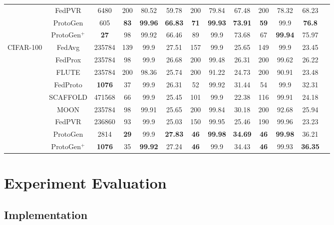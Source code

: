 \documentclass[lettersize,journal]{IEEEtran}
\begin{document}
\begin{table}[t]
{\begin{tabular}{ccccccccccccc}
& FedPVR   & 6480 & 200 & 80.52 & 59.78 & 200 & 79.84 & 67.48 & 200 & 78.32 & 68.23 \\
& \textsf{ProtoGen}   & 605 & \textbf{83} & \textbf{99.96} & \textbf{66.83} & \textbf{71} & \textbf{99.93} & \textbf{73.91} & \textbf{59} & 99.9 & \textbf{76.8} \\
& \textsf{ProtoGen}$^+$   & \textbf{27} & 98 & 99.92 & 66.46 & 89 & 99.9 & 73.68 & 67 & \textbf{99.94} & 75.97 \\
\midrule
\multirow{9}{2cm}{\centering CIFAR-100} 
& FedAvg   & 235784 & 139 & 99.9 & 27.51 & 157 & 99.9 & 25.65 & 149 & 99.9 & 23.45 \\
& FedProx & 235784 & 98 & 99.9 & 26.68 & 200 & 99.48 & 26.31 & 200 & 99.62 & 26.22 \\
& FLUTE   & 235784 & 200 & 98.36 & 25.74 & 200 & 91.22 & 24.73 & 200 & 90.91 & 23.48 \\
& FedProto & \textbf{1076} & 37 & 99.9 & 26.31 & 52 & 99.92 & 31.44 & 54 & 99.9 & 32.31 \\
& SCAFFOLD & 471568 & 66 & 99.9 & 25.45 & 101 & 99.9 & 22.38 & 116 & 99.91 & 24.18 \\
& MOON     & 235784 & 98 & 99.91 & 25.65 & 200 & 99.84 & 30.18 & 200 & 92.68 & 25.94 \\
& FedPVR   & 236860 & 93 & 99.9 & 25.03 & 150 & 99.95 & 25.46 & 190 & 99.96 & 23.23 \\
& \textsf{ProtoGen}   & 2814 & \textbf{29} & 99.9 & \textbf{27.83} & \textbf{46} & \textbf{99.98} & \textbf{34.69} & \textbf{46} & \textbf{99.98} & 36.21  \\
& \textsf{ProtoGen}$^+$   & \textbf{1076} & 35 & \textbf{99.92} & 27.24 & \textbf{46} & 99.9 & 34.43 & \textbf{46} & 99.93 & \textbf{36.35}  \\
\bottomrule
\end{tabular}
}
\end{table}


\section{Experiment Evaluation}
\label{sec:experiments}
\subsection{Implementation}
\end{document}
